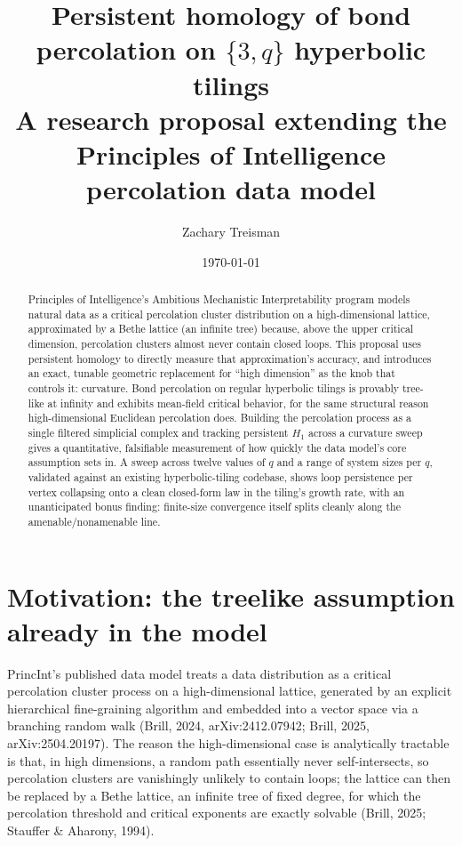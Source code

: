 \documentclass[11pt]{article}
\title{Persistent homology of bond percolation on $\{3,q\}$ hyperbolic tilings\\[0.4em]
\large A research proposal extending the Principles of Intelligence percolation data model}
\author{Zachary Treisman}
\date{\today}
\begin{document}
\maketitle

\begin{abstract}
Principles of Intelligence's Ambitious Mechanistic Interpretability program models natural data as a critical percolation cluster distribution on a high-dimensional lattice, approximated by a Bethe lattice (an infinite tree) because, above the upper critical dimension, percolation clusters almost never contain closed loops. This proposal uses persistent homology to directly measure that approximation's accuracy, and introduces an exact, tunable geometric replacement for ``high dimension'' as the knob that controls it: curvature. Bond percolation on regular hyperbolic tilings is provably tree-like at infinity and exhibits mean-field critical behavior, for the same structural reason high-dimensional Euclidean percolation does. Building the percolation process as a single filtered simplicial complex and tracking persistent $H_1$ across a curvature sweep gives a quantitative, falsifiable measurement of how quickly the data model's core assumption sets in. A sweep across twelve values of $q$ and a range of system sizes per $q$, validated against an existing hyperbolic-tiling codebase, shows loop persistence per vertex collapsing onto a clean closed-form law in the tiling's growth rate, with an unanticipated bonus finding: finite-size convergence itself splits cleanly along the amenable/nonamenable line.
\end{abstract}

\section{Motivation: the treelike assumption already in the model}

PrincInt's published data model treats a data distribution as a critical percolation cluster process on a high-dimensional lattice, generated by an explicit hierarchical fine-graining algorithm and embedded into a vector space via a branching random walk (Brill, 2024, arXiv:2412.07942; Brill, 2025, arXiv:2504.20197). The reason the high-dimensional case is analytically tractable is that, in high dimensions, a random path essentially never self-intersects, so percolation clusters are vanishingly unlikely to contain loops; the lattice can then be replaced by a Bethe lattice, an infinite tree of fixed degree, for which the percolation threshold and critical exponents are exactly solvable (Brill, 2025; Stauffer \& Aharony, 1994).
\end{document}

